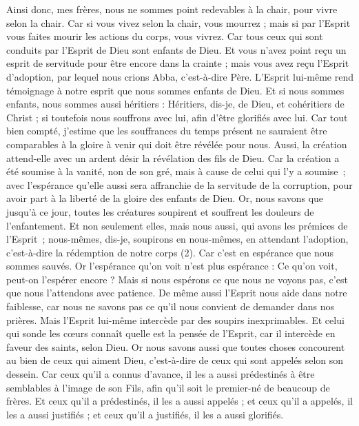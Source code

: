 \begin{multicols}{2}
Ainsi donc, mes frères, nous ne sommes point redevables à la chair, pour vivre selon la chair.
Car si vous vivez selon la chair, vous mourrez ; mais si par l'Esprit vous faites mourir les actions du corps, vous vivrez.
Car tous ceux qui sont conduits par l'Esprit de Dieu sont enfants de Dieu.
Et vous n'avez point reçu un esprit de servitude pour être encore dans la crainte ; mais vous avez reçu l'Esprit d'adoption, par lequel nous crions Abba, c'est-à-dire Père.
L’Esprit lui-même rend témoignage à notre esprit que nous sommes enfants de Dieu.
Et si nous sommes enfants, nous sommes aussi héritiers : Héritiers, dis-je, de Dieu, et cohéritiers de Christ ; si toutefois nous souffrons avec lui, afin d’être glorifiés avec lui.
Car tout bien compté, j'estime que les souffrances du temps présent ne sauraient être comparables à la gloire à venir qui doit être révélée pour nous.
Aussi, la création attend-elle avec un ardent désir la révélation des fils de Dieu.
Car la création a été soumise à la vanité, non de son gré, mais à cause de celui qui l’y a soumise ;
avec l’espérance qu’elle aussi sera affranchie de la servitude de la corruption, pour avoir part à la liberté de la gloire des enfants de Dieu.
Or, nous savons que jusqu’à ce jour, toutes les créatures soupirent et souffrent les douleurs de l’enfantement.
Et non seulement elles, mais nous aussi, qui avons les prémices de l'Esprit ; nous-mêmes, dis-je, soupirons en nous-mêmes, en attendant l'adoption, c'est-à-dire la rédemption de notre corps (2).
Car c’est en espérance que nous sommes sauvés. Or l’espérance qu’on voit n’est plus espérance : Ce qu’on voit, peut-on l’espérer encore ?
Mais si nous espérons ce que nous ne voyons pas, c'est que nous l'attendons avec patience.
De même aussi l’Esprit nous aide dans notre faiblesse, car nous ne savons pas ce qu’il nous convient de demander dans nos prières. Mais l’Esprit lui-même intercède par des soupirs inexprimables.
Et celui qui sonde les cœurs connaît quelle est la pensée de l'Esprit, car il intercède en faveur des saints, selon Dieu.
Or nous savons aussi que toutes choses concourent au bien de ceux qui aiment Dieu, c'est-à-dire de ceux qui sont appelés selon son dessein.
Car ceux qu'il a connus d’avance, il les a aussi prédestinés à être semblables à l'image de son Fils, afin qu'il soit le premier-né de beaucoup de frères.
Et ceux qu'il a prédestinés, il les a aussi appelés ; et ceux qu'il a appelés, il les a aussi justifiés ; et ceux qu'il a justifiés, il les a aussi glorifiés.

\end{multicols}
